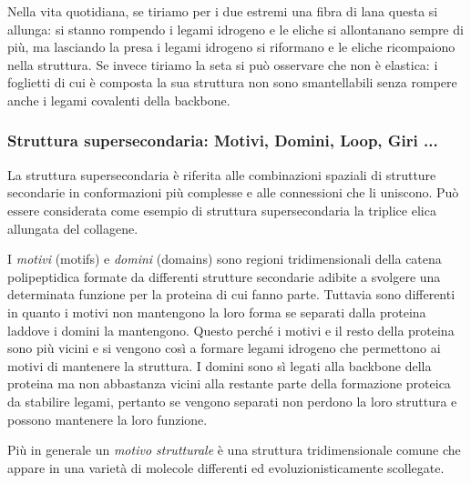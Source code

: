 \par Nella vita quotidiana, se tiriamo per i due estremi una fibra di lana questa si allunga: si stanno rompendo i legami idrogeno e le eliche si allontanano sempre di più, ma lasciando la presa i legami idrogeno si riformano e le eliche ricompaiono nella struttura. Se invece tiriamo la seta si può osservare che non è elastica: i foglietti di cui è composta la sua struttura non sono smantellabili senza rompere anche i legami covalenti della backbone.


\subsubsection{Struttura supersecondaria: Motivi, Domini, Loop, Giri ...}
La struttura supersecondaria è riferita alle combinazioni spaziali di strutture secondarie in conformazioni più complesse e alle connessioni che li uniscono. Può essere considerata come esempio di struttura supersecondaria la triplice elica allungata del collagene.

\par I \textit{motivi} (motifs) e \textit{domini} (domains) sono regioni tridimensionali della catena polipeptidica formate da differenti strutture secondarie adibite a svolgere una determinata funzione per la proteina di cui fanno parte. Tuttavia sono differenti in quanto i motivi non mantengono la loro forma se separati dalla proteina laddove i domini la mantengono. Questo perché i motivi e il resto della proteina sono più vicini e si vengono così a formare legami idrogeno che permettono ai motivi di mantenere la struttura. I domini sono sì legati alla backbone della proteina ma non abbastanza vicini alla restante parte della formazione proteica da stabilire legami, pertanto se vengono separati non perdono la loro struttura e possono mantenere la loro funzione.

\par Più in generale un \textit{motivo strutturale} è una struttura tridimensionale comune che appare in una varietà di molecole differenti ed evoluzionisticamente scollegate.

